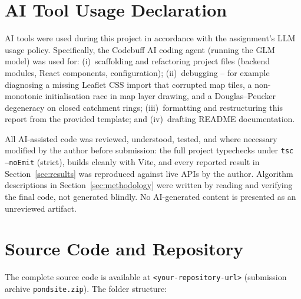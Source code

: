 \documentclass[manuscript,screen,review]{acmart}
\begin{document}
\section{AI Tool Usage Declaration}
\label{sec:ai-usage}
AI tools were used during this project in accordance with the assignment's
LLM usage policy. Specifically, the Codebuff AI coding agent (running the
GLM model) was used for: (i)~scaffolding and refactoring project files
(backend modules, React components, configuration); (ii)~debugging -- for
example diagnosing a missing Leaflet CSS import that corrupted map tiles, a
non-monotonic initialisation race in map layer drawing, and a
Douglas--Peucker degeneracy on closed catchment rings; (iii)~formatting and
restructuring this report from the provided template; and (iv)~drafting
README documentation.

All AI-assisted code was reviewed, understood, tested, and where necessary
modified by the author before submission: the full project typechecks under
\texttt{tsc --noEmit} (strict), builds cleanly with Vite, and every
reported result in Section~\ref{sec:results} was reproduced against live
APIs by the author. Algorithm descriptions in Section~\ref{sec:methodology}
were written by reading and verifying the final code, not generated
blindly. No AI-generated content is presented as an unreviewed artifact.


\appendix

\section{Source Code and Repository}
The complete source code is available at
\texttt{<your-repository-url>} (submission archive \texttt{pondsite.zip}).
The folder structure:
\end{document}
